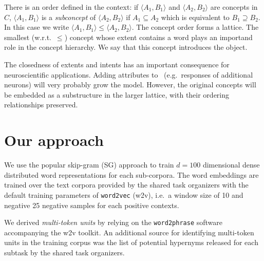 \documentclass[11pt,a4paper]{article}
\begin{document}
There is an order defined in the context:
if $\langle A_1 , B_1 \rangle$ and $\langle A_2 , B_2 \rangle$ are concepts in
$C$, $\langle A_1 , B_1 \rangle$ is a \emph{subconcept} of $\langle A_2 , B_2
\rangle$ if $A_1 \subseteq A_2 $ which is equivalent to $B_1 \supseteq B_2 $.  In this case
we write $\langle A_1 , B_1 \rangle \le \langle A_2 , B_2 \rangle$.
The concept order forms a %
lattice.  
The smallest (w.r.t.~$\le$) concept whose extent contains a word plays an
importand role in the concept hierarchy.  We say that this concept 
introduces the object.  

The closedness of extents and intents has an important consequence for
neuroscientific applications. Adding attributes to \at~(e.g.~responses of
additional neurons) will very probably grow the model.  However, the original
concepts will be embedded as a substructure in the larger lattice, with their
ordering relationships preserved.

\section{Our approach}

We use the popular skip-gram (SG) %
approach \citep{Mikolov:2013f} to train $d=100$ dimensional dense distributed
word representations for each sub-corpora. The word embeddings are trained over the text corpora provided by the shared task organizers with the default training parameters of \texttt{word2vec} (w2v), i.e.~a window size of 10 and negative 25 negative samples for each positive contexts.

We derived \emph{multi-token units} by relying on the \texttt{word2phrase} software accompanying the w2v toolkit. An additional source for identifying multi-token units in the training corpus was the list of potential hypernyms released for each subtask by the shared task organizers.
\end{document}
